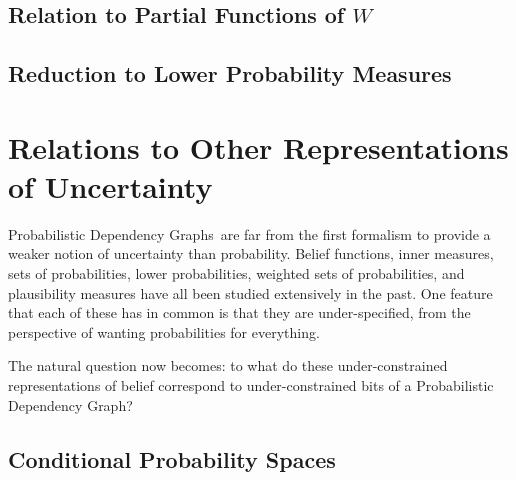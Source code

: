 \documentclass{article}
\newcommand{\modelname}{Probabilistic Dependency Graph}
\newcommand{\modelnames}{Probabilistic Dependency Graphs}
\begin{document}
	\subsection{Relation to Partial Functions of $W$}
	\subsection{Reduction to Lower Probability Measures}
	
	
	

	\section{Relations to Other Representations of Uncertainty}
	\modelnames\ are far from the first formalism to provide a weaker notion of uncertainty than probability. Belief functions, inner measures, sets of probabilities, lower probabilities, weighted sets of probabilities, and plausibility measures have all been studied extensively in the past. One feature that each of these has in common is that they are under-specified, from the perspective of wanting probabilities for everything.
	
	\begin{center}
	\end{center}
	

	The natural question now becomes: to what do these under-constrained representations of belief correspond to under-constrained bits of a \modelname?
	
	\subsection{Conditional Probability Spaces}
	
	\begin{center}
	\end{center}
	
\end{document}
